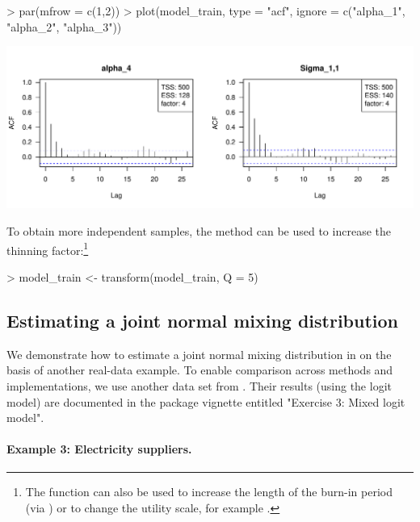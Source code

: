 \documentclass[article]{jss}
\newcommand{\fct}[1]{\code{#1()}}
\begin{document}
\begin{Schunk}
\begin{Sinput}
> par(mfrow = c(1,2))
> plot(model_train, type = "acf", ignore = c("alpha_1", "alpha_2", "alpha_3"))
\end{Sinput}
\end{Schunk}
\includegraphics{rprobitb_oelschlaeger_bauer-model-train-acf}

To obtain more independent samples, the \fct{transform} method can be used to increase the thinning factor:\footnote{The function can also be used to increase the length of the burn-in period (via ) or to change the utility scale, for example .}

\begin{Schunk}
\begin{Sinput}
> model_train <- transform(model_train, Q = 5)
\end{Sinput}
\end{Schunk}

\subsection{Estimating a joint normal mixing distribution} \label{subsec:normal_mix}

We demonstrate how to estimate a joint normal mixing distribution in  on the basis of another real-data example. To enable comparison across methods and implementations, we use another data set from . Their results (using the logit model) are documented in the package vignette entitled "Exercise 3: Mixed logit model".

\paragraph{Example 3: Electricity suppliers.}
\end{document}
